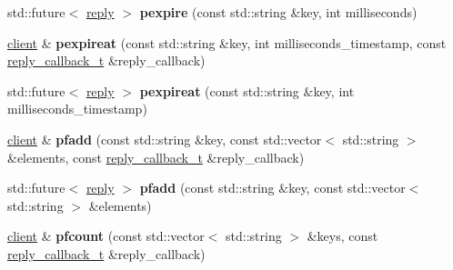 \begin{DoxyCompactItemize}
\item 
\mbox{\label{classcpp__redis_1_1client_aa0974d486cae342eced35d64c6e68d40}} 
std\+::future$<$ \hyperlink{classcpp__redis_1_1reply}{reply} $>$ {\bfseries pexpire} (const std\+::string \&key, int milliseconds)
\item 
\mbox{\label{classcpp__redis_1_1client_a7c872e32ed28a78515c1711e4cafbabf}} 
\hyperlink{classcpp__redis_1_1client}{client} \& {\bfseries pexpireat} (const std\+::string \&key, int milliseconds\+\_\+timestamp, const \hyperlink{classcpp__redis_1_1client_a061a1140d36d2eaeda82b09a0bb3f9f2}{reply\+\_\+callback\+\_\+t} \&reply\+\_\+callback)
\item 
\mbox{\label{classcpp__redis_1_1client_af7aeaf2681d57fc30c8535c8d5df1e72}} 
std\+::future$<$ \hyperlink{classcpp__redis_1_1reply}{reply} $>$ {\bfseries pexpireat} (const std\+::string \&key, int milliseconds\+\_\+timestamp)
\item 
\mbox{\label{classcpp__redis_1_1client_ade84308f3ef8bfc75c092388ec538469}} 
\hyperlink{classcpp__redis_1_1client}{client} \& {\bfseries pfadd} (const std\+::string \&key, const std\+::vector$<$ std\+::string $>$ \&elements, const \hyperlink{classcpp__redis_1_1client_a061a1140d36d2eaeda82b09a0bb3f9f2}{reply\+\_\+callback\+\_\+t} \&reply\+\_\+callback)
\item 
\mbox{\label{classcpp__redis_1_1client_ac6534e0aaf0ef3c87e312b12fd1a5a97}} 
std\+::future$<$ \hyperlink{classcpp__redis_1_1reply}{reply} $>$ {\bfseries pfadd} (const std\+::string \&key, const std\+::vector$<$ std\+::string $>$ \&elements)
\item 
\mbox{\label{classcpp__redis_1_1client_acf88e97aac689b64af0e73843811d837}} 
\hyperlink{classcpp__redis_1_1client}{client} \& {\bfseries pfcount} (const std\+::vector$<$ std\+::string $>$ \&keys, const \hyperlink{classcpp__redis_1_1client_a061a1140d36d2eaeda82b09a0bb3f9f2}{reply\+\_\+callback\+\_\+t} \&reply\+\_\+callback)
\item 
\mbox{\label{classcpp__redis_1_1client_ad357677011d10800e2595db129bfbfff}} 

\end{DoxyCompactItemize}
